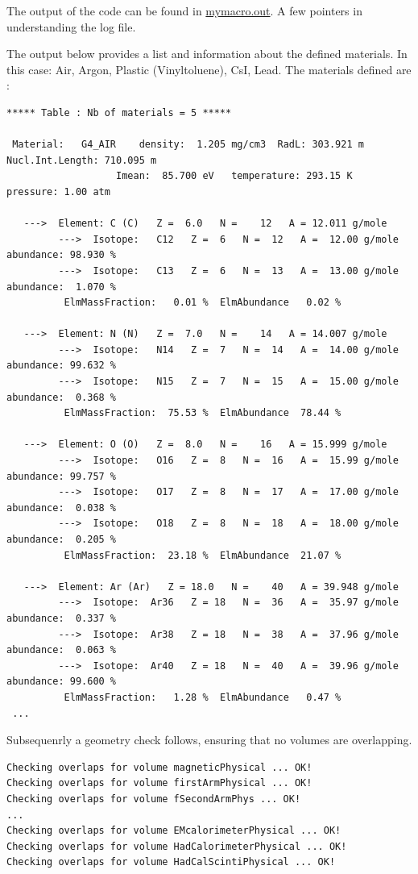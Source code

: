 \documentclass[a4paper,11pt,twoside]{article}
\begin{document}
The output of the code can be found in \href{https://github.com/knikolop-bham/MPAGS-EPPT-B5/blob/master/mymacro.out}{mymacro.out}.
A few pointers in understanding the log file.

The output below provides a list and information about the defined materials. In this case: Air, Argon, Plastic (Vinyltoluene), CsI, Lead.
The materials defined are : 
\begin{lstlisting}
***** Table : Nb of materials = 5 *****

 Material:   G4_AIR    density:  1.205 mg/cm3  RadL: 303.921 m  Nucl.Int.Length: 710.095 m  
                   Imean:  85.700 eV   temperature: 293.15 K  pressure: 1.00 atm

   --->  Element: C (C)   Z =  6.0   N =    12   A = 12.011 g/mole
         --->  Isotope:   C12   Z =  6   N =  12   A =  12.00 g/mole   abundance: 98.930 %
         --->  Isotope:   C13   Z =  6   N =  13   A =  13.00 g/mole   abundance:  1.070 %
          ElmMassFraction:   0.01 %  ElmAbundance   0.02 % 

   --->  Element: N (N)   Z =  7.0   N =    14   A = 14.007 g/mole
         --->  Isotope:   N14   Z =  7   N =  14   A =  14.00 g/mole   abundance: 99.632 %
         --->  Isotope:   N15   Z =  7   N =  15   A =  15.00 g/mole   abundance:  0.368 %
          ElmMassFraction:  75.53 %  ElmAbundance  78.44 % 

   --->  Element: O (O)   Z =  8.0   N =    16   A = 15.999 g/mole
         --->  Isotope:   O16   Z =  8   N =  16   A =  15.99 g/mole   abundance: 99.757 %
         --->  Isotope:   O17   Z =  8   N =  17   A =  17.00 g/mole   abundance:  0.038 %
         --->  Isotope:   O18   Z =  8   N =  18   A =  18.00 g/mole   abundance:  0.205 %
          ElmMassFraction:  23.18 %  ElmAbundance  21.07 % 

   --->  Element: Ar (Ar)   Z = 18.0   N =    40   A = 39.948 g/mole
         --->  Isotope:  Ar36   Z = 18   N =  36   A =  35.97 g/mole   abundance:  0.337 %
         --->  Isotope:  Ar38   Z = 18   N =  38   A =  37.96 g/mole   abundance:  0.063 %
         --->  Isotope:  Ar40   Z = 18   N =  40   A =  39.96 g/mole   abundance: 99.600 %
          ElmMassFraction:   1.28 %  ElmAbundance   0.47 % 
 ... 
\end{lstlisting}

Subsequenrly a geometry check follows, ensuring that no volumes are overlapping.
\begin{lstlisting}
Checking overlaps for volume magneticPhysical ... OK! 
Checking overlaps for volume firstArmPhysical ... OK! 
Checking overlaps for volume fSecondArmPhys ... OK! 
...
Checking overlaps for volume EMcalorimeterPhysical ... OK! 
Checking overlaps for volume HadCalorimeterPhysical ... OK! 
Checking overlaps for volume HadCalScintiPhysical ... OK! 
\end{lstlisting}
\end{document}
